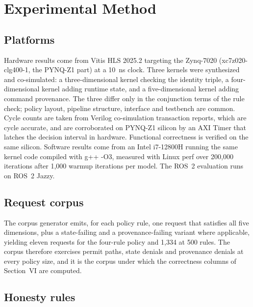 \documentclass[conference]{IEEEtran}
\newcommand{\new}[1]{\textcolor{hkred}{#1}}
\begin{document}
\section{Experimental Method}

\subsection{Platforms}

Hardware results come from Vitis HLS 2025.2 targeting the Zynq-7020 (xc7z020-clg400-1, the PYNQ-Z1 part) at a 10~ns clock. \new{Three kernels were synthesized and co-simulated: a three-dimensional kernel checking the identity triple, a four-dimensional kernel adding runtime state, and a five-dimensional kernel adding command provenance. The three differ only in the conjunction terms of the rule check; policy layout, pipeline structure, interface and testbench are common.} Cycle counts are taken from Verilog co-simulation transaction reports, which are cycle accurate\new{, and are corroborated on PYNQ-Z1 silicon by an AXI Timer that latches the decision interval in hardware}. Functional correctness is verified on the same silicon. Software results come from an Intel i7-12800H running the same kernel code compiled with g++ -O3, measured with Linux perf over 200{,}000 iterations after 1{,}000 warmup iterations per model. The ROS~2 evaluation runs on ROS~2 Jazzy.

\subsection{Request corpus}

The corpus generator emits, for each policy rule, one request that satisfies all five dimensions, plus a state-failing and a provenance-failing variant where applicable, yielding eleven requests for the four-rule policy and 1{,}334 at 500 rules. The corpus therefore exercises permit paths, state denials and provenance denials at every policy size, and it is the corpus under which the correctness columns of Section~VI are computed.

\subsection{Honesty rules}
\end{document}
